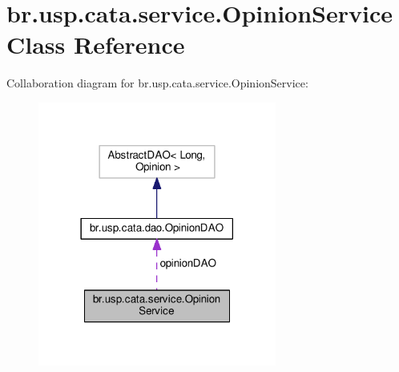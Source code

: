 \hypertarget{classbr_1_1usp_1_1cata_1_1service_1_1_opinion_service}{\section{br.\+usp.\+cata.\+service.\+Opinion\+Service Class Reference}
\label{classbr_1_1usp_1_1cata_1_1service_1_1_opinion_service}
}


Collaboration diagram for br.\+usp.\+cata.\+service.\+Opinion\+Service\+:\nopagebreak
\begin{figure}[H]
\begin{center}
\leavevmode
\includegraphics[width=222pt]{classbr_1_1usp_1_1cata_1_1service_1_1_opinion_service__coll__graph}
\end{center}
\end{figure}
